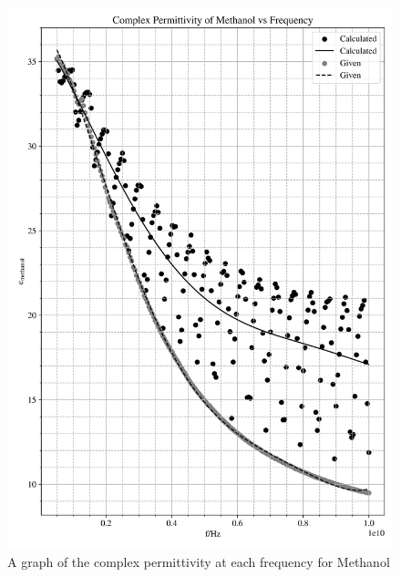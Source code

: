 \documentclass[12pt, a4paper]{article}
\begin{document}
\begin{multicols*}{2}
\begin{figure}[H]
    \centering
    \includegraphics[width = \linewidth]{Plot1.png}\caption{A graph of the complex permittivity at each frequency for Methanol}\label{fig: Methanol Graph}
\end{figure}

\begin{table}[H]
    \centering
    \caption{A table of four different data points for methanol}\label{tab: Table 1}
\end{table}


\end{multicols*}
\end{document}
